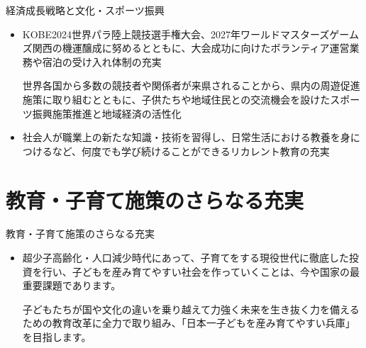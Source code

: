 \documentclass[dvipdfmx]{beamer}
\begin{document}
    \begin{frame}{経済成長戦略と文化・スポーツ振興}{}
        \begin{small}
            \begin{itemize}
                \setlength{\parsep}{.5mm}
                \setlength{\itemsep}{2mm}
                \item KOBE2024世界パラ陸上競技選手権大会、2027年ワールドマスターズゲームズ関西の機運醸成に努めるとともに、大会成功に向けたボランティア運営業務や宿泊の受け入れ体制の充実\par
                世界各国から多数の競技者や関係者が来県されることから、県内の周遊促進施策に取り組むとともに、子供たちや地域住民との交流機会を設けたスポーツ振興施策推進と地域経済の活性化
                \item 社会人が職業上の新たな知識・技術を習得し、日常生活における教養を身につけるなど、何度でも学び続けることができるリカレント教育の充実
            \end{itemize}
        \end{small}
    \end{frame}

\section{教育・子育て施策のさらなる充実}
    \begin{frame}{}{}
        \sectionpage
    \end{frame}

    \begin{frame}{教育・子育て施策のさらなる充実}{}
        \begin{small}
            \begin{itemize}
                \setlength{\parsep}{.5mm}
                \setlength{\itemsep}{2mm}
                \item 超少子高齢化・人口減少時代にあって、子育てをする現役世代に徹底した投資を行い、子どもを産み育てやすい社会を作っていくことは、今や国家の最重要課題であります。\par
                子どもたちが国や文化の違いを乗り越えて力強く未来を生き抜く力を備えるための教育改革に全力で取り組み、「日本一子どもを産み育てやすい兵庫」を目指します。
            \end{itemize}
        \end{small}
    \end{frame}
\end{document}
